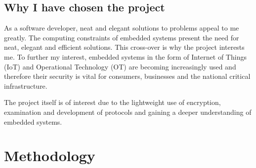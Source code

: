 \documentclass[10pt]{report}
\begin{document}
\section*{Why I have chosen the project}
As a software developer, neat and elegant solutions to problems appeal to me greatly. The computing constraints of embedded systems present the need for neat, elegant and efficient solutions. This cross-over is why the project interests me. To further my interest, embedded systems in the form of Internet of Things (IoT) and Operational Technology (OT) are becoming increasingly used and therefore their security is vital for consumers, businesses and the national critical infrastructure.

The project itself is of interest due to the lightweight use of encryption, examination and development of protocols and gaining a deeper understanding of embedded systems.

\chapter*{Methodology}
\end{document}
